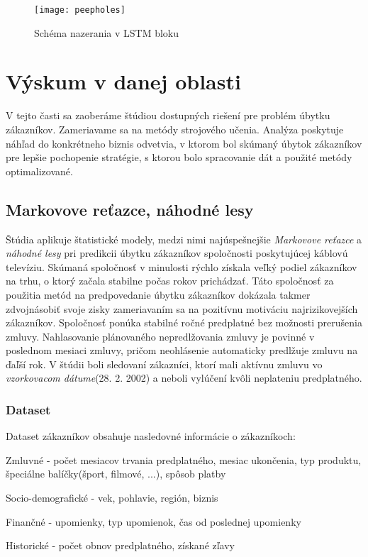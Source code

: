 \begin{figure}[H]
\begin{center}
\texttt{[image: peepholes]}\end{center}
\caption[peepholes]{Schéma nazerania v LSTM bloku}\label{fig:peepholes}
\end{figure}

\section{Výskum v danej oblasti}
\label{analyza_vyskum_danej_oblasti}

V tejto časti sa zaoberáme štúdiou dostupných riešení pre problém úbytku zákazníkov. Zameriavame sa na metódy strojového učenia. Analýza poskytuje náhľad do konkrétneho biznis odvetvia, v ktorom bol skúmaný úbytok zákazníkov pre lepšie pochopenie stratégie, s ktorou bolo spracovanie dát a použité metódy optimalizované.

\subsection{Markovove reťazce, náhodné lesy}

Štúdia aplikuje štatistické modely, medzi nimi najúspešnejšie \textit{Markovove reťazce} a \textit{náhodné lesy} pri predikcii úbytku zákazníkov spoločnosti poskytujúcej káblovú televíziu. Skúmaná spoločnosť v minulosti rýchlo získala veľký podiel zákazníkov na trhu, o ktorý začala stabilne počas rokov prichádzať. Táto spoločnosť za použitia metód na predpovedanie úbytku zákazníkov dokázala takmer zdvojnásobiť svoje zisky zameriavaním sa na pozitívnu motiváciu najrizikovejších zákazníkov.
\newline
Spoločnosť ponúka stabilné ročné predplatné bez možnosti prerušenia zmluvy. Nahlasovanie plánovaného nepredlžovania zmluvy je povinné v poslednom mesiaci zmluvy, pričom neohlásenie automaticky predlžuje zmluvu na ďaľší rok. V štúdii boli sledovaní zákazníci, ktorí mali aktívnu zmluvu vo \textit{vzorkovacom dátume}(28. 2. 2002) a neboli vylúčení kvôli neplateniu predplatného. 
\newline
\subsubsection{Dataset}
\label{markov_dataset}
Dataset zákazníkov obsahuje nasledovné informácie o zákazníkoch:

\begin{my_itemize}
	\item{Zmluvné} - počet mesiacov trvania predplatného, mesiac ukončenia, typ produktu, špeciálne balíčky(šport, filmové, ...), spôsob platby
	\item{Socio-demografické} - vek, pohlavie, región, biznis
	\item{Finančné} - upomienky, typ upomienok, čas od poslednej upomienky
	\item{Historické} - počet obnov predplatného, získané zľavy 
\end{my_itemize}


